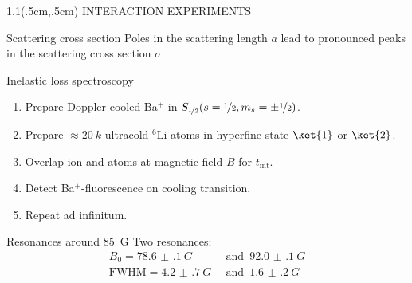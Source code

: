 \begin{frame}[plain, t]
    \begin{textblock*}{1.1\linewidth}(.5cm,.5cm)
        {\huge \color{white} \textsc{INTERACTION EXPERIMENTS}}
    \end{textblock*}
\end{frame}

\begin{frame}[t]{Scattering cross section}
    Poles in the scattering length $a$ lead to pronounced peaks in the scattering cross section $\sigma$
\end{frame}

\begin{frame}[t]{Inelastic loss spectroscopy}
    \vspace{.28\linewidth}
    \begin{enumerate}
        \setlength\itemsep{0.5em}
    \item<1-> Prepare Doppler-cooled Ba$^+$ in $S_{\nicefrac{1}{2}}(s=\nicefrac{1}{2},
        m_s=\pm\nicefrac{1}{2})$.
    \item<2-> Prepare $\approx \SI{20}{k}$ ultracold $^6$Li atoms in hyperfine state $\ket{1}$ or $\ket{2}$.
    \item<3-> Overlap ion and atoms at magnetic field $B$ for $t_\text{int}$.
    \item<4-> Detect Ba$^+$-fluorescence on cooling transition.
    \item<5> Repeat ad infinitum.
    \end{enumerate}
\end{frame}

\begin{frame}[t]{Resonances around \SI{85}{G}}
    Two resonances:
    \setlength{\abovedisplayshortskip}{-15pt}
    \setlength{\abovedisplayskip}{5pt}
    \begin{align*}
        B_0 = \SI{78.6(1)}{G} \enspace&\text{and}\enspace \SI{92.0(1)}{G} \\
        \text{FWHM} = \SI{4.2(7)}{G} \enspace&\text{and}\enspace \SI{1.6(2)}{G}
    \end{align*}
\end{frame}

